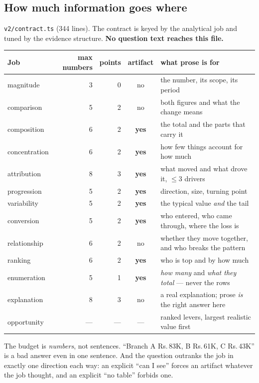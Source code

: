 \documentclass[11pt,a4paper]{report}
\newcommand{\rs}[1]{Rs.\,#1}
\newcommand{\file}[1]{\texttt{\small #1}}
\begin{document}
\subsection{How much information goes where}

\file{v2/contract.ts} (344 lines). The contract is keyed by the analytical job and tuned by the
evidence structure. \textbf{No question text reaches this file.}

\begin{center}
\small
\begin{tabular}{@{}lrrcl@{}}
\toprule
\textbf{Job} & \textbf{max numbers} & \textbf{points} & \textbf{artifact} & \textbf{what prose is for}\\
\midrule
magnitude & 3 & 0 & no & the number, its scope, its period\\
comparison & 5 & 2 & no & both figures and what the change means\\
composition & 6 & 2 & \textbf{yes} & the total and the parts that carry it\\
concentration & 6 & 2 & \textbf{yes} & how few things account for how much\\
attribution & 8 & 3 & \textbf{yes} & what moved and what drove it, $\leq$3 drivers\\
progression & 5 & 2 & \textbf{yes} & direction, size, turning point\\
variability & 5 & 2 & \textbf{yes} & the typical value \emph{and} the tail\\
conversion & 5 & 2 & \textbf{yes} & who entered, who came through, where the loss is\\
relationship & 6 & 2 & no & whether they move together, and who breaks the pattern\\
ranking & 6 & 2 & \textbf{yes} & who is top and by how much\\
enumeration & 5 & 1 & \textbf{yes} & \emph{how many} and \emph{what they total} --- never the rows\\
explanation & 8 & 3 & no & a real explanation; prose \emph{is} the right answer here\\
opportunity & --- & --- & --- & ranked levers, largest realistic value first\\
\bottomrule
\end{tabular}
\end{center}

\noindent The budget is \emph{numbers}, not sentences. ``Branch A \rs{83}K, B \rs{61}K, C
\rs{43}K'' is a bad answer even in one sentence. And the question outranks the job in exactly one
direction each way: an explicit ``can I see'' forces an artifact whatever the job thought, and an
explicit ``no table'' forbids one.
\end{document}
